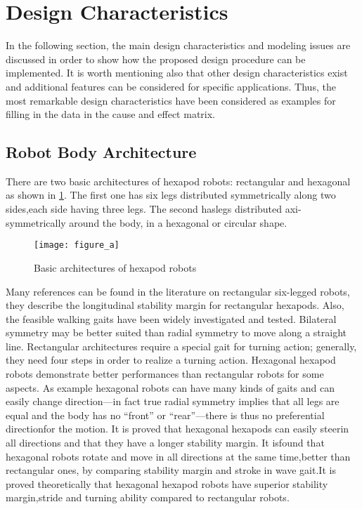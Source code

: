 
\section{Design Characteristics}
In the following section, the main design characteristics and modeling issues are discussed in order to show how the proposed design procedure can be implemented. It is worth mentioning also that other design characteristics exist and additional features can be considered for specific applications. Thus, the most remarkable design characteristics have been considered as examples for filling in the data in the cause and effect matrix.

\subsection{Robot Body Architecture}
There are two basic architectures of hexapod robots: rectangular and hexagonal as shown in \ref {figure a.png}. The first one has six legs distributed symmetrically along two sides,each side having three legs. The second haslegs distributed axi-symmetrically around the body, in a hexagonal or circular shape.

\begin{figure}[h]
	\centering
	\texttt{[image: figure\_a]}
	\caption{Basic architectures of hexapod robots}
	\label{figure a.png}
\end{figure}

Many references can be found in the literature on rectangular six-legged robots, they describe the longitudinal stability margin for rectangular hexapods. Also, the feasible walking gaits have been widely investigated and tested. Bilateral symmetry may be better suited than radial symmetry to move along a straight line. Rectangular architectures require a special gait for turning action; generally, they need four steps in order to realize a turning action. Hexagonal hexapod robots demonstrate better performances than rectangular robots for some aspects. As example hexagonal robots can have many kinds of gaits and can easily change direction—in fact true radial symmetry implies that all legs are equal and the body has no “front” or “rear”—there is thus no preferential directionfor the motion. It is proved that hexagonal hexapods can easily steerin all directions and that they have a longer stability margin. It isfound that hexagonal robots rotate and move in all directions at the same time,better than rectangular ones, by comparing stability margin and stroke in wave gait.It is proved theoretically that hexagonal hexapod robots have superior stability margin,stride and turning ability compared to rectangular robots.

